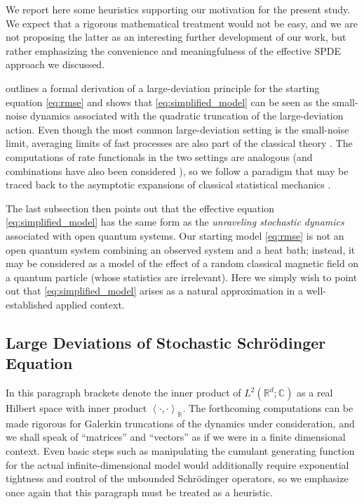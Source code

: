 \documentclass[a4paper,10pt]{amsart}
\newcommand{\C}{\mathbb{C}}
\newcommand{\R}{\mathbb{R}}
\newcommand{\brak}[1]{\left\langle#1\right\rangle}
\theoremstyle{remark}
\numberwithin{equation}{section}
\begin{document}
We report here some heuristics supporting our motivation for the present study. We expect that a rigorous mathematical treatment would not be easy, and we are not proposing the latter as an interesting further development of our work, but rather emphasizing the convenience and meaningfulness of the effective SPDE approach we discussed.

 outlines a formal derivation of a large-deviation
principle for the starting equation \eqref{eq:rmse} and shows that
\eqref{eq:simplified_model} can be seen as the small-noise dynamics
associated with the quadratic truncation of the large-deviation action.
Even though the most common large-deviation setting is the small-noise
limit, averaging limits of fast processes are also part of the classical
theory \cite[Chapter 7]{freidlinwentzell3}. The computations of rate
functionals in the two settings are analogous (and combinations have also
been considered \cite{veretennikov}), so we follow a paradigm that may be
traced back to the asymptotic expansions of classical statistical mechanics
\cite{touchette2009}.

The last subsection then points out that the effective equation
\eqref{eq:simplified_model} has the same form as the \emph{unraveling
stochastic dynamics} associated with open quantum systems. Our starting
model \eqref{eq:rmse} is not an open quantum system combining an observed
system and a heat bath; instead, it may be considered as a model of the
effect of a random classical magnetic field on a quantum particle (whose
statistics are irrelevant). Here we simply wish to point out that
\eqref{eq:simplified_model} arises as a natural approximation in a
well-established applied context.

\subsection{Large Deviations of Stochastic Schr\"odinger Equation}
\label{ssec:ldpsse}
In this paragraph brackets denote the inner product of $L^2(\R^d;\C)$  as a real Hilbert space with inner product $\brak{\cdot,\cdot}_\R$. The forthcoming computations can be made rigorous for Galerkin truncations of the dynamics under consideration, and we shall speak of ``matrices'' and ``vectors'' as if we were in a finite dimensional context. 
Even basic steps such as manipulating the cumulant generating function for the actual infinite-dimensional model would additionally require exponential tightness and control of the unbounded Schr\"odinger operators, so we emphasize once again that this paragraph must be treated as a heuristic.
\end{document}
